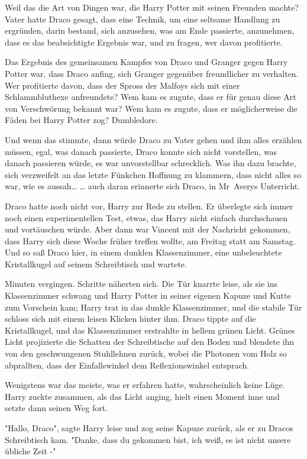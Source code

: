 {Weil das die Art von Dingen war, die Harry Potter mit seinen Freunden machte? Vater hatte Draco gesagt, dass eine Technik, um eine seltsame Handlung zu ergründen, darin bestand, sich anzusehen, was am Ende passierte, anzunehmen, dass es das beabsichtigte Ergebnis war, und zu fragen, wer davon profitierte.

Das Ergebnis des gemeinsamen Kampfes von Draco und Granger gegen Harry Potter war, dass Draco anfing, sich Granger gegenüber freundlicher zu verhalten. Wer profitierte davon, dass der Spross der Malfoys sich mit einer Schlammbluthexe anfreundete? Wem kam es zugute, dass er für genau diese Art von Verschwörung bekannt war? Wem kam es zugute, dass er möglicherweise die Fäden bei Harry Potter zog? Dumbledore.

Und wenn das stimmte, dann würde Draco zu Vater gehen und ihm alles erzählen müssen, egal, was danach passierte, Draco konnte sich nicht vorstellen, was danach passieren würde, es war unvorstellbar schrecklich. Was ihn dazu brachte, sich verzweifelt an das letzte Fünkchen Hoffnung zu klammern, dass nicht alles so war, wie es aussah… … auch daran erinnerte sich Draco, in Mr~Averys Unterricht.

Draco hatte noch nicht vor, Harry zur Rede zu stellen. Er überlegte sich immer noch einen experimentellen Test, etwas, das Harry nicht einfach durchschauen und vortäuschen würde. Aber dann war Vincent mit der Nachricht gekommen, dass Harry sich diese Woche früher treffen wollte, am Freitag statt am Samstag. Und so saß Draco hier, in einem dunklen Klassenzimmer, eine unbeleuchtete Kristallkugel auf seinem Schreibtisch und wartete.

Minuten vergingen. Schritte näherten sich. Die Tür knarrte leise, als sie ins Klassenzimmer schwang und Harry Potter in seiner eigenen Kapuze und Kutte zum Vorschein kam; Harry trat in das dunkle Klassenzimmer, und die stabile Tür schloss sich mit einem leisen Klicken hinter ihm. Draco tippte auf die Kristallkugel, und das Klassenzimmer erstrahlte in hellem grünen Licht. Grünes Licht projizierte die Schatten der Schreibtische auf den Boden und blendete ihn von den geschwungenen Stuhllehnen zurück, wobei die Photonen vom Holz so abprallten, dass der Einfallswinkel dem Reflexionswinkel entsprach.

Wenigstens war das meiste, was er erfahren hatte, wahrscheinlich keine Lüge. Harry zuckte zusammen, als das Licht anging, hielt einen Moment inne und setzte dann seinen Weg fort.

"Hallo, Draco", sagte Harry leise und zog seine Kapuze zurück, als er zu Dracos Schreibtisch kam. "Danke, dass du gekommen bist, ich weiß, es ist nicht unsere übliche Zeit -"

}
